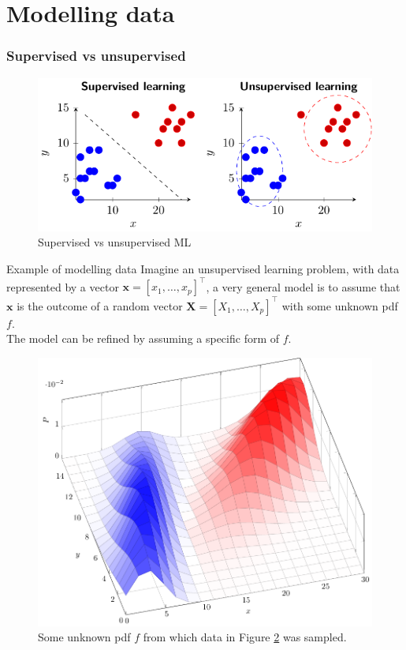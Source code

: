 \documentclass{beamer}
\begin{document}
\section{Modelling data}


\begin{frame}
  \frametitle{Supervised vs unsupervised}
    
    \begin{figure}
      \includegraphics{supervised_unsupervised}
      \caption{Supervised vs unsupervised ML}
      \label{fig:supunsup}
    \end{figure}
  
  \end{frame}

\begin{frame}[allowframebreaks]{Example of modelling data}
  \label{sld:model}
  Imagine an unsupervised learning problem, with data represented by a vector $\bm{x}=[x_1,\ldots,x_p]^\intercal$, a very general model is to assume that $\bm{x}$ is the outcome of a random vector $\bm{X}=[X_1,\ldots,X_p]^\intercal$ with some unknown pdf $f$.\\[2ex]
 
  The model can be refined by assuming a specific form of $f$.

  \begin{figure}
    \includegraphics[width=0.5\linewidth]{2dbivariate}
    \caption{Some unknown pdf $f$ from which data in Figure \ref{fig:supunsup} was sampled.}
    \label{fig:supunsup}
  \end{figure}
\end{frame}
\end{document}
